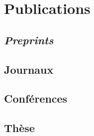 \documentclass{moderncv}
\begin{document}
\section{Publications}

% 

\newcommand{\bibindex}{\theBibIndex\addtocounter{BibIndex}{-1}\stepcounter{NbRefs}}
% 

\subsection{\itshape Preprints}\vspace{0.5em}


\subsection{Journaux}\vspace{0.5em}


\subsection{Conférences}\vspace{0.5em}


\subsection{Thèse}\vspace{0.5em}

\end{document}
